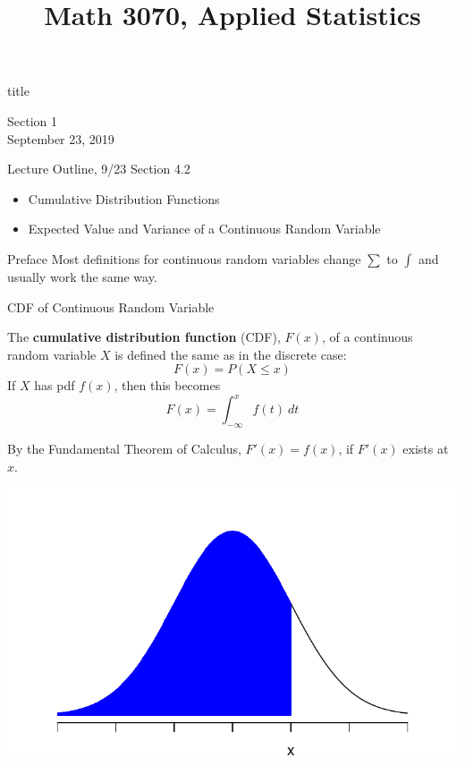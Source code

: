 \documentclass[handout]{beamer}
\title{Math 3070, Applied Statistics}
\newcommand{\nl}[1]{\vspace{#1 em}}
\begin{document}
\begin{frame}
    \begin{beamercolorbox}[rounded=true,wd=\textwidth,center]{title}
        \inserttitle
    \end{beamercolorbox}
    \begin{center}
        Section 1\\
        \nl{0.5}
        September 23, 2019
    \end{center}
\end{frame}

\begin{frame}{Lecture Outline, 9/23}
    Section 4.2
    \begin{itemize}
        \item Cumulative Distribution Functions
        \item Expected Value and Variance of a Continuous Random Variable
    \end{itemize}
\end{frame}
\begin{frame}{Preface}
    Most definitions for continuous random variables change $\sum$ to $\int$ and usually work the same way.
\end{frame}
\begin{frame}{CDF of Continuous Random Variable}
    \begin{block}{}
        The \textbf{cumulative distribution function} (CDF), $F(x)$, of a continuous random variable $X$ is defined the same as in the discrete case:
        $$F(x) = P(X \leq x)$$
        If $X$ has pdf $f(x)$, then this becomes
        $$F(x) = \int_{-\infty}^x f(t)\ dt$$
    \end{block}
    \pause By the Fundamental Theorem of Calculus, $F'(x)=f(x)$, if $F'(x)$ exists at $x$.
    \vspace{-.5cm}
    \begin{center}
        \includegraphics[scale=.4]{ch4_cdf_norm.pdf}
    \end{center}
\end{frame}
\end{document}
